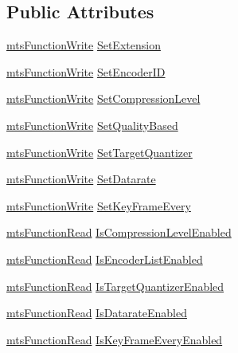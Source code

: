 \subsection*{Public Attributes}
\begin{DoxyCompactItemize}
\item 
\hyperlink{classmts_function_write}{mts\+Function\+Write} \hyperlink{class_i_req_video_encoder_aa86ec80db25cb67ffcfa26f7854f1558}{Set\+Extension}
\item 
\hyperlink{classmts_function_write}{mts\+Function\+Write} \hyperlink{class_i_req_video_encoder_a2fb9540255360b9db74be79f56ae6808}{Set\+Encoder\+I\+D}
\item 
\hyperlink{classmts_function_write}{mts\+Function\+Write} \hyperlink{class_i_req_video_encoder_a405f5708c6730da10eaa27c39cb6a988}{Set\+Compression\+Level}
\item 
\hyperlink{classmts_function_write}{mts\+Function\+Write} \hyperlink{class_i_req_video_encoder_a1504d33fbcfbea1d10f206106da74868}{Set\+Quality\+Based}
\item 
\hyperlink{classmts_function_write}{mts\+Function\+Write} \hyperlink{class_i_req_video_encoder_a5178233369b251350c538a239477f859}{Set\+Target\+Quantizer}
\item 
\hyperlink{classmts_function_write}{mts\+Function\+Write} \hyperlink{class_i_req_video_encoder_a76ea2366cc302bfb4b80037e8bb76a97}{Set\+Datarate}
\item 
\hyperlink{classmts_function_write}{mts\+Function\+Write} \hyperlink{class_i_req_video_encoder_a1e9188a979450ad1c3d71be5ad90dd2f}{Set\+Key\+Frame\+Every}
\item 
\hyperlink{classmts_function_read}{mts\+Function\+Read} \hyperlink{class_i_req_video_encoder_a347cb959317c01f134b806786da73fd9}{Is\+Compression\+Level\+Enabled}
\item 
\hyperlink{classmts_function_read}{mts\+Function\+Read} \hyperlink{class_i_req_video_encoder_aea51b8231253b9d5858db8ee46347356}{Is\+Encoder\+List\+Enabled}
\item 
\hyperlink{classmts_function_read}{mts\+Function\+Read} \hyperlink{class_i_req_video_encoder_a2b8cdbb2dd719ed1e38b8b3ea6821a7c}{Is\+Target\+Quantizer\+Enabled}
\item 
\hyperlink{classmts_function_read}{mts\+Function\+Read} \hyperlink{class_i_req_video_encoder_a1de1f00a33225eb14bd5582401e30117}{Is\+Datarate\+Enabled}
\item 
\hyperlink{classmts_function_read}{mts\+Function\+Read} \hyperlink{class_i_req_video_encoder_a492b0452c80889adfb90f1971c3e4eab}{Is\+Key\+Frame\+Every\+Enabled}

\end{DoxyCompactItemize}
